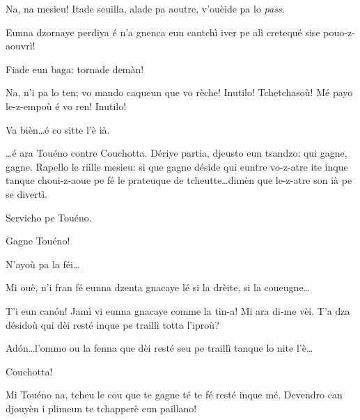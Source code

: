 \begin{drama}

\Sandrinospeaks Na, na mesieu! Itade seuilla, alade pa aoutre, v'ouèide pa lo \textit{pass}. 

\Genespeaks Eunna dzornaye perdiya é n'a gnenca eun cantchì iver pe alì cretequé sise pouo-z-aouvrì! 

\Sandrinospeaks Fiade eun baga: tornade demàn!

\Genespeaks Na, n'i pa lo ten; vo mando caqueun que vo rèche! Inutilo! Tchetchasoù! Mé payo le-z-empoù é vo ren! Inutilo!


\Sandrinospeaks Va bièn\ldots é co sitte l'è ià.




\Treisouspeaks \ldots é ara Touéno contre Couchotta. Dériye partia, djeusto eun tsandzo: qui gagne, gagne. Rapello le riille mesieu: si que gagne déside qui euntre vo-z-atre ite inque tanque choui-z-aoue pe fé le prateuque de tcheutte\ldots dimèn que le-z-atre son ià pe se divertì.


\Treisouspeaks Servicho pe Touéno.


\Treisouspeaks Gagne Touéno!

\Treisouspeaks{} N’ayoù pa la féi\ldots

\Tuenospeaks Mi ouè, n'i fran fé eunna dzenta gnacaye lé si la drèite, si la coueugne\ldots

\Treisouspeaks T'i eun can\'on! Jamì vi eunna gnacaye comme la tin-a! Mi ara di-me vèi. T'a dza désidoù qui dèi resté inque pe traillì totta l'iproù?

\Tuenospeaks Ad\'on\ldots l'ommo ou la fenna que dèi resté seu pe traillì tanque lo nite l'è\ldots 


\Tuenospeaks{} Couchotta!

\Gerominespeaks Mi Touéno na, tcheu le cou que te gagne té te fé resté inque mé. Devendro can djouyèn i plimeun te tchapperè eun paillano!


\end{drama}
